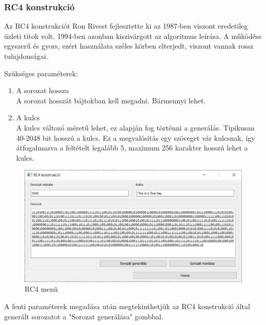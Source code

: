 \documentclass[12pt]{article}
\begin{document}
	\subsubsection{RC4 konstrukció}
	Az RC4 konstrukciót Ron Rivest fejlesztette ki az 1987-ben viszont eredetileg üzleti titok volt. 1994-ben azonban kiszivárgott az algoritmus leírása. A működése egyszerű és gyors, ezért használata széles körben elterjedt, viszont vannak rossz tulajdonságai.
	\par
	Szükséges paraméterek:
	\begin{enumerate}
		\bfseries\item A sorozat hossza \\
		\normalfont A sorozat hosszát bájtokban kell megadni. Bármennyi lehet.
		\bfseries \item A kulcs
		\\
		\normalfont A kulcs változó méretű lehet, ez alapján fog történni a generálás. Tipikusan 40-2048 bit hosszú a kulcs. Ez a megvalósítás egy szöveget vár kulcsnak, így átfogalmazva a feltételt legalább 5, maximum 256 karakter hosszú lehet a kulcs.
	\end{enumerate}
	\begin{figure}[h]
		\centering
		\begin{minipage}{\textwidth} %
			\includegraphics[width=\textwidth]{RC4menu.png}
		\end{minipage}
		\caption{RC4 menü}
	\end{figure}
	A fenti paraméterek megadása után megtekinthetjük az RC4 konstrukció által generált sorozatot a "Sorozat generálása" gombbal.
\end{document}
